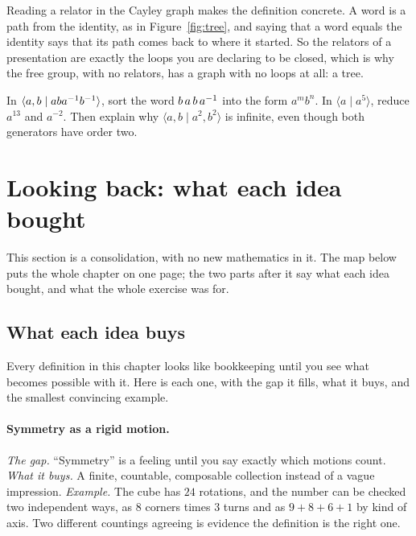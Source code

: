 Reading a relator in the Cayley graph makes the definition concrete. A word is a path from the
identity, as in Figure~\ref{fig:tree}, and saying that a word equals the identity says that its path
comes back to where it started. So the relators of a presentation are exactly the loops you are
declaring to be closed, which is why the free group, with no relators, has a graph with no loops at
all: a tree.

\begin{tryit}
In $\langle a,b\mid aba^{-1} b^{-1}\rangle$, sort the word $b\,a\,b\,a^{-1}$ into the form $a^mb^n$.
In $\langle a\mid a^5\rangle$, reduce $a^{13}$ and $a^{-2}$. Then explain why
$\langle a,b\mid a^2,b^2\rangle$ is infinite, even though both generators have order two.
\end{tryit}

\section{Looking back: what each idea bought}\label{sec:retro}

This section is a consolidation, with no new mathematics in it. The map below puts the whole
chapter on one page; the two parts after it say what each idea bought, and what the whole exercise
was for.


\subsection{What each idea buys}

Every definition in this chapter looks like bookkeeping until you see what becomes possible with it. Here is each one, with the gap it fills, what it buys, and the smallest convincing example.

\paragraph{Symmetry as a rigid motion.} \emph{The gap.} ``Symmetry'' is a feeling until you say exactly which motions count. \emph{What it buys.} A finite, countable, composable collection instead of a vague impression. \emph{Example.} The cube has $24$ rotations, and the number can be checked two independent ways, as $8$ corners times $3$ turns and as $9+8+6+1$ by kind of axis. Two different countings agreeing is evidence the definition is the right one.

